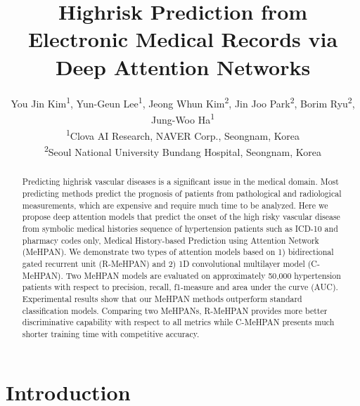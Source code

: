 \documentclass{article}
\title{Highrisk Prediction from Electronic Medical Records via Deep Attention Networks}
\author{
  You Jin Kim\textsuperscript{1}, Yun-Geun Lee\textsuperscript{1}, Jeong Whun Kim\textsuperscript{2}, Jin Joo Park\textsuperscript{2}, Borim Ryu\textsuperscript{2}, Jung-Woo Ha\textsuperscript{1} \\
  \textsuperscript{1}Clova AI Research, NAVER Corp., Seongnam, Korea \\
  \textsuperscript{2}Seoul National University Bundang Hospital, Seongnam, Korea \\
}
\begin{document}

\maketitle

\begin{abstract}
Predicting highrisk vascular diseases is a significant issue in the medical domain. Most predicting methods predict the prognosis of patients from pathological and radiological measurements, which are expensive and require much time to be analyzed. Here we propose deep attention models that predict the onset of the high risky vascular disease from symbolic medical histories sequence of hypertension patients such as ICD-10 and pharmacy codes only, Medical History-based Prediction using Attention Network (MeHPAN). We demonstrate two types of attention models based on 1) bidirectional gated recurrent unit (R-MeHPAN) and 2) 1D convolutional multilayer model (C-MeHPAN). Two MeHPAN models are evaluated on approximately 50,000 hypertension patients with respect to precision, recall, f1-measure and area under the curve (AUC). Experimental results show that our MeHPAN methods outperform standard classification models. Comparing two MeHPANs, R-MeHPAN provides more better discriminative capability with respect to all metrics while C-MeHPAN presents much shorter training time with competitive accuracy. 




\end{abstract}

\section{Introduction}
\end{document}

